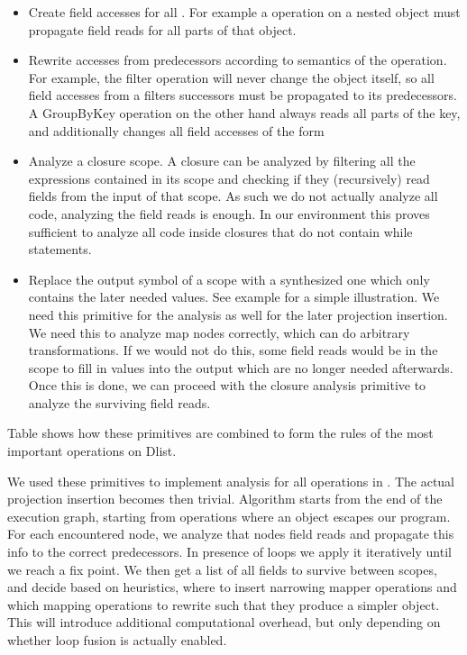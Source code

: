 \begin{itemize}
\item Create field accesses for all . For example a  operation on a nested object must propagate field reads for all parts of that object.
\item Rewrite accesses from predecessors  according to semantics of the operation. For example, the filter operation will never change the object itself, so all field accesses from a filters successors must be propagated to its predecessors. A GroupByKey operation on the other hand always reads all parts of the key, and additionally changes all field accesses of the form  
\item Analyze a closure scope. A closure can be analyzed by filtering all the expressions contained in its scope and checking if they (recursively) read fields from the input of that scope. As such we do not actually analyze all code, analyzing the field reads is enough. In our environment this proves sufficient to analyze all code inside closures that do not contain while statements. 
\item Replace the output symbol of a scope with a synthesized one which only contains the later needed values. See example  for a simple illustration. We need this primitive for the analysis as well for the later projection insertion. We need this to analyze map nodes correctly, which can do arbitrary transformations. If we would not do this, some field reads would be in the scope to fill in values into the output which are no longer needed afterwards.
Once this is done, we can proceed with the closure analysis primitive to analyze the surviving field reads.
\end{itemize}
Table  shows how these primitives are combined to form the rules of the most important operations on Dlist.

We used these primitives to implement analysis for all operations in \tool. The actual projection insertion becomes then trivial. Algorithm starts from the end of the execution graph, starting from operations where an object escapes our program. For each encountered node, we analyze that nodes field reads and propagate this info to the correct predecessors. In presence of loops we apply it iteratively until we reach a fix point. We then get a list of all fields to survive between scopes, and decide based on heuristics, where to insert narrowing mapper operations and which mapping operations to rewrite such that they produce a simpler object. This will introduce
additional computational overhead, but only depending on whether loop fusion is actually enabled. 



